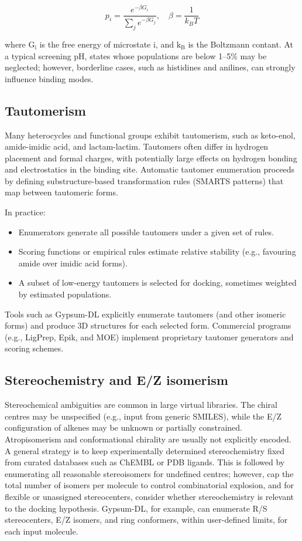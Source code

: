 \documentclass[12pt]{article}
\begin{document}
\begin{equation}
p_i = \frac{e^{-\beta G_i}}{\sum_j e^{-\beta G_j}}, \quad \beta = \frac{1}{k_B T}
\end{equation}

where $\textrm{G}_\textrm{i}$ is the free energy of microstate i, and $\textrm{k}_\textrm{B}$ is the Boltzmann contant. At a typical screening pH, states whose populations are below 1--5\% may be neglected; however, borderline cases, such as histidines and anilines, can strongly influence binding modes.

\subsection{Tautomerism}

Many heterocycles and functional groups exhibit tautomerism, such as keto-enol, amide-imidic acid, and lactam-lactim. Tautomers often differ in hydrogen placement and formal charges, with potentially large effects on hydrogen bonding and electrostatics in the binding site. Automatic tautomer enumeration proceeds by defining substructure-based transformation rules (SMARTS patterns) that map between tautomeric forms.

In practice:
\begin{itemize}
  \item Enumerators generate all possible tautomers under a given set of rules.
  \item Scoring functions or empirical rules estimate relative stability (e.g., favouring amide over imidic acid forms).
  \item A subset of low-energy tautomers is selected for docking, sometimes weighted by estimated populations.
\end{itemize}

Tools such as Gypsum-DL explicitly enumerate tautomers (and other isomeric forms) and produce 3D structures for each selected form\cite{CH6_Ropp2019}. Commercial programs (e.g., LigPrep, Epik, and MOE) implement proprietary tautomer generators and scoring schemes\cite{CH6_Sastry2013}.

\subsection{Stereochemistry and E/Z isomerism}

Stereochemical ambiguities are common in large virtual libraries. The chiral centres may be unspecified (e.g., input from generic SMILES), while the E/Z configuration of alkenes may be unknown or partially constrained. Atropisomerism and conformational chirality are usually not explicitly encoded. A general strategy is to keep experimentally determined stereochemistry fixed from curated databases such as ChEMBL or PDB ligands. This is followed by enumerating all reasonable stereoisomers for undefined centres; however, cap the total number of isomers per molecule to control combinatorial explosion, and for flexible or unassigned stereocenters, consider whether stereochemistry is relevant to the docking hypothesis. Gypsum-DL\cite{CH6_Ropp2019}, for example, can enumerate R/S stereocenters, E/Z isomers, and ring conformers, within user-defined limits, for each input molecule.
\end{document}
